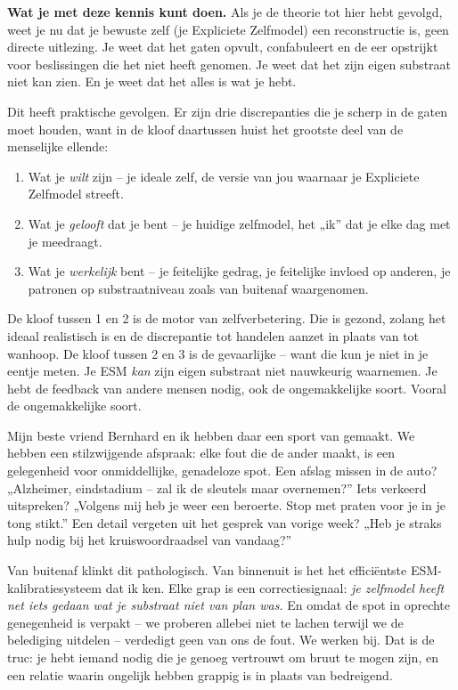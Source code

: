 \documentclass[11pt, twoside, openright]{book}
\begin{document}
\textbf{Wat je met deze kennis kunt doen.} Als je de theorie tot hier hebt gevolgd, weet je nu dat je bewuste zelf (je Expliciete Zelfmodel) een reconstructie is, geen directe uitlezing. Je weet dat het gaten opvult, confabuleert en de eer opstrijkt voor beslissingen die het niet heeft genomen. Je weet dat het zijn eigen substraat niet kan zien. En je weet dat het alles is wat je hebt.

Dit heeft praktische gevolgen. Er zijn drie discrepanties die je scherp in de gaten moet houden, want in de kloof daartussen huist het grootste deel van de menselijke ellende:

\begin{enumerate}
  \item Wat je \textit{wilt} zijn -- je ideale zelf, de versie van jou waarnaar je Expliciete Zelfmodel streeft.
  \item Wat je \textit{gelooft} dat je bent -- je huidige zelfmodel, het „ik” dat je elke dag met je meedraagt.
  \item Wat je \textit{werkelijk} bent -- je feitelijke gedrag, je feitelijke invloed op anderen, je patronen op substraatniveau zoals van buitenaf waargenomen.
\end{enumerate}

De kloof tussen 1 en 2 is de motor van zelfverbetering. Die is gezond, zolang het ideaal realistisch is en de discrepantie tot handelen aanzet in plaats van tot wanhoop. De kloof tussen 2 en 3 is de gevaarlijke -- want die kun je niet in je eentje meten. Je ESM \textit{kan} zijn eigen substraat niet nauwkeurig waarnemen. Je hebt de feedback van andere mensen nodig, ook de ongemakkelijke soort. Vooral de ongemakkelijke soort.

Mijn beste vriend Bernhard en ik hebben daar een sport van gemaakt. We hebben een stilzwijgende afspraak: elke fout die de ander maakt, is een gelegenheid voor onmiddellijke, genadeloze spot. Een afslag missen in de auto? „Alzheimer, eindstadium -- zal ik de sleutels maar overnemen?” Iets verkeerd uitspreken? „Volgens mij heb je weer een beroerte. Stop met praten voor je in je tong stikt.” Een detail vergeten uit het gesprek van vorige week? „Heb je straks hulp nodig bij het kruiswoordraadsel van vandaag?”

Van buitenaf klinkt dit pathologisch. Van binnenuit is het het efficiëntste ESM-kalibratiesysteem dat ik ken. Elke grap is een correctiesignaal: \textit{je zelfmodel heeft net iets gedaan wat je substraat niet van plan was.} En omdat de spot in oprechte genegenheid is verpakt -- we proberen allebei niet te lachen terwijl we de belediging uitdelen -- verdedigt geen van ons de fout. We werken bij. Dat is de truc: je hebt iemand nodig die je genoeg vertrouwt om bruut te mogen zijn, en een relatie waarin ongelijk hebben grappig is in plaats van bedreigend.
\end{document}
